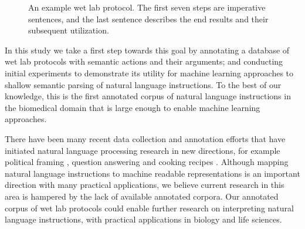 \documentclass[11pt,a4paper]{article}
\begin{document}
\begin{figure}[ht]
\centering
{}

\caption{An example wet lab protocol. The first seven steps are imperative sentences, and the last sentence describes the end results and their subsequent utilization.}
\label{fig:protocol}
\end{figure}
In this study we take a first step towards this goal by annotating a database of wet lab protocols with semantic actions and their arguments; and conducting initial experiments to demonstrate its utility for machine learning approaches to shallow semantic parsing of natural language instructions. To the best of our knowledge, this is the first annotated corpus of natural language instructions in the biomedical domain that is large enough to enable machine learning approaches. 

There have been many recent data collection and annotation efforts that have initiated natural language processing research in new directions, for example political framing \cite{card2015media}, question answering \cite{rajpurkar2016squad} and cooking recipes \cite{jermsurawong2015predicting}. Although mapping natural language instructions to machine readable representations is an important direction with many practical applications, we believe current research in this area is hampered by the lack of available annotated corpora. Our annotated corpus of wet lab protocols could enable further research on interpreting natural language instructions, with practical applications in biology and life sciences.
\end{document}
